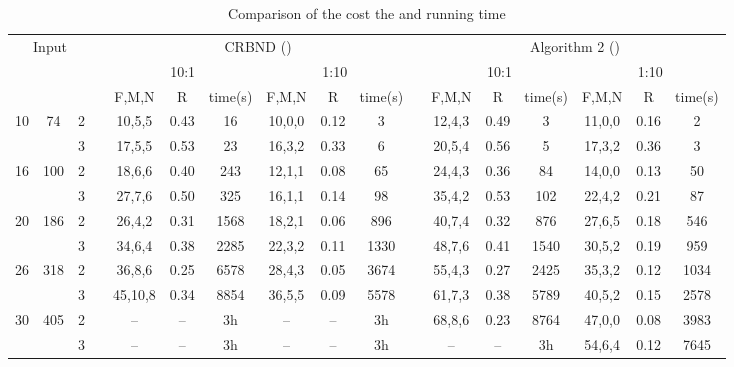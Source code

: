 \documentclass[onecolumn,11pt,draftclsnofoot]{IEEEtran}
\begin{document}
\begin{table}[!htbp]
\setlength{\tabcolsep}{3pt}
\center
\caption{Comparison of the cost the and running time}
\label{tab:comparison}
\begin{tabular}{c  c  c c c c c  c c  c c c c  c c  c c}
\toprule
\multicolumn{3}{c}{\multirow{2}{*}{Input}} & &  \multicolumn{6}{c}{CRBND ()} & &  \multicolumn{6}{c}{Algorithm 2 ()} \\
\cline{6-9} \cline{13-16}
\multicolumn{1}{c}{} & \multicolumn{1}{c}{}  & \multicolumn{1}{c}{}& &  \multicolumn{3}{c}{10:1} & \multicolumn{3}{c}{1:10} & & \multicolumn{3}{c}{10:1} & \multicolumn{3}{c}{1:10}\\
\cline{1-3} \cline{5-10} \cline{12-17}
 &  &  & &  F,M,N & R &time(s) & F,M,N & R &time(s) & & F,M,N & R &time(s)  & F,M,N & R &time(s)\\
\hline
\multirow{2}{*}{10} &\multirow{2}{*}{74} &2  &  &10,5,5 &0.43 &16   &10,0,0 &0.12 &3  &   &12,4,3 &0.49 &3  &11,0,0 &0.16 &2\\
                                        &  &3 &  &17,5,5 &0.53 &23    &16,3,2 &0.33 &6  &  &20,5,4 &0.56 &5   &17,3,2 &0.36 &3 \\
\hline
\multirow{2}{*}{16} &\multirow{2}{*}{100} &2 &  &18,6,6 &0.40 &243   &12,1,1 &0.08 &65 &  &24,4,3 &0.36 &84   &14,0,0 &0.13 &50\\
                                          & &3  & &27,7,6 &0.50 &325   &16,1,1 &0.14 &98  &  &35,4,2 &0.53 &102   &22,4,2 &0.21 &87\\
\hline
\multirow{2}{*}{20} &\multirow{2}{*}{186} &2 &  &26,4,2 &0.31 &1568    &18,2,1 &0.06 &896 &  &40,7,4 &0.32 &876   &27,6,5 &0.18  &546\\
                                       &  &3  &  &34,6,4 &0.38 &2285   &22,3,2 &0.11 &1330  &  &48,7,6 &0.41 &1540   &30,5,2 &0.19 &959\\
\hline
\multirow{2}{*}{26} &\multirow{2}{*}{318} &2 &   &36,8,6   &0.25 &6578   &28,4,3 &0.05 &3674 &   &55,4,3 &0.27 &2425   &35,3,2 &0.12 &1034\\
                                       &  &3 &   &45,10,8  &0.34 &8854   &36,5,5 &0.09  &5578 &  &61,7,3 &0.38 &5789  &40,5,2 &0.15 &2578\\
\hline
\multirow{2}{*}{30} &\multirow{2}{*}{405} &2 &  &-- &-- & 3h     &-- &-- & 3h  &  &68,8,6 &0.23 &8764  &47,0,0 &0.08 &3983\\
                                          & &3  & &-- &-- & 3h   &-- &-- & 3h  &  &-- &-- & 3h      &54,6,4 &0.12 &7645\\
\bottomrule
\end{tabular}
\hfill
\end{table}
\end{document}
